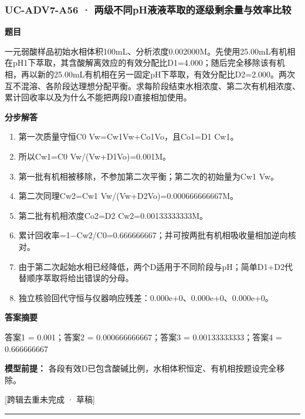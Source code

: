 \documentclass[UTF8,11pt,a4paper]{ctexart}
\begin{document}
\subsubsection*{UC-ADV7-A56 · 两级不同pH液液萃取的逐级剩余量与效率比较}
\noindent\textbf{题目}\par
一元弱酸样品初始水相体积100mL、分析浓度0.002000M。先使用25.00mL有机相在pH1下萃取，其含酸解离效应的有效分配比D1=4.000；随后完全移除该有机相，再以新的25.00mL有机相在另一固定pH下萃取，有效分配比D2=2.000。两次互不混溶、各阶段达理想分配平衡。求每阶段结束水相浓度、第二次有机相浓度、累计回收率以及为什么不能把两段D直接相加使用。\par
\medskip\noindent\textbf{分步解答}
\begin{enumerate}
\item 第一次质量守恒C0 Vw=Cw1Vw+Co1Vo，且Co1=D1 Cw1。
\item 所以Cw1=C0 Vw/(Vw+D1Vo)=0.001M。
\item 第一批有机相被移除，不参加第二次平衡；第二次的初始量为Cw1 Vw。
\item 第二次同理Cw2=Cw1 Vw/(Vw+D2Vo)=0.000666666667M。
\item 第二批有机相浓度Co2=D2 Cw2=0.00133333333M。
\item 累计回收率=1−Cw2/C0=0.666666667；并可按两批有机相吸收量相加逆向核对。
\item 由于第二次起始水相已经降低，两个D适用于不同阶段与pH；简单D1+D2代替顺序萃取将给出错误的分母。
\item 独立核验回代守恒与仪器响应残差：0.000e+0、0.000e+0、0.000e+0。
\end{enumerate}
\noindent\textbf{答案摘要}\par
答案1 = 0.001；答案2 = 0.000666666667；答案3 = 0.00133333333；答案4 = 0.666666667\par
\noindent\textbf{模型前提：}
各段有效D已包含酸碱比例，水相体积恒定、有机相按题设完全移除。\par
\noindent\textcolor{red!65!black}{[跨辑去重未完成 · 草稿]} \par
\medskip\hrule\medskip
{}
\end{document}
